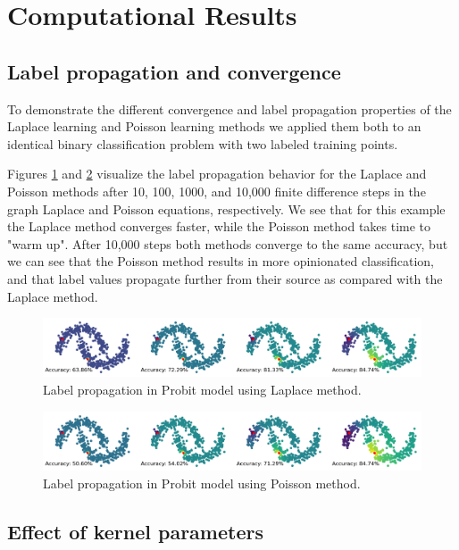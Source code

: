 \documentclass[11pt]{amsart}
\begin{document}
\section{Computational Results}\label{sec:results}


\subsection{Label propagation and convergence}
To demonstrate the different convergence and label propagation properties of the Laplace learning and Poisson learning methods we applied them both to an identical binary classification problem with two labeled training points. 

Figures \ref{laplace_propagation} and \ref{poisson_propagation} visualize the label propagation behavior for the Laplace and Poisson methods after 10, 100, 1000, and 10,000 finite difference steps in the graph Laplace and Poisson equations, respectively. We see that for this example the Laplace method converges faster, while the Poisson method takes time to "warm up". After 10,000 steps both methods converge to the same accuracy, but we can see that the Poisson method results in more opinionated classification, and that label values propagate further from their source as compared with the Laplace method. 

\begin{figure}[h!]
    \includegraphics[width=15cm]{Figs/LaplaceSSL.png}
    \caption{Label propagation in Probit model using Laplace method.}
    \label{laplace_propagation}
\end{figure}

\begin{figure}[h!]
    \includegraphics[width=15cm]{Figs/PoissonSSL.png}
    \caption{Label propagation in Probit model using Poisson method.}
    \label{poisson_propagation}
\end{figure}

\subsection{Effect of kernel parameters}
\end{document}
